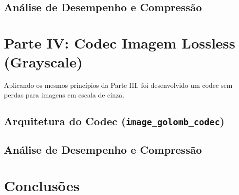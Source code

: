 \documentclass[a4paper, 11pt, portuguese]{article}
\begin{document}
\subsection{Análise de Desempenho e Compressão}



\section{Parte IV: Codec Imagem Lossless (Grayscale)}

Aplicando os mesmos princípios da Parte III, foi desenvolvido um codec sem perdas para imagens em escala de cinza.

\subsection{Arquitetura do Codec (\texttt{image\_golomb\_codec})}


\subsection{Análise de Desempenho e Compressão}



\section{Conclusões}



%
\end{document}
